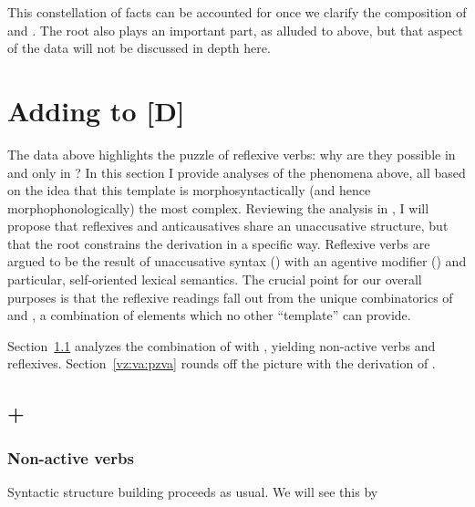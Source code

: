 \begin{exe}
\begin{xlist}
\begin{xlist}
\begin{exe}
\begin{xlist}
\begin{xlist}
\begin{exe}
\begin{xlist}
\begin{xlist}
\begin{exe}
\begin{exe}
\begin{xlist}
\begin{exe}
\begin{exe}
\begin{xlist}
\begin{exe}
\begin{exe}
\begin{exe}
\begin{exe}
\begin{exe}
\begin{xlist}
\begin{exe}
\begin{xlist}
\begin{exe}
\begin{exe}
\begin{xlist}
\begin{exe}
\begin{xlist}
\begin{exe}
\begin{xlist}
\begin{exe}
\begin{exe}
\begin{exe}
\begin{xlist}
\begin{exe}
\begin{exe}
\begin{exe}
\begin{xlist}
\begin{exe}
\begin{xlist}
\begin{exe}
\begin{exe}
\begin{xlist}
\begin{exe}
\begin{exe}
\begin{exe}
\begin{exe}
\begin{xlist}
\begin{exe}
\begin{xlist}
\begin{exe}
\begin{xlist}
\begin{exe}
\begin{xlist}
\begin{exe}
\begin{xlist}
\begin{exe}
\begin{xlist}
\begin{exe}
\begin{exe}
\begin{xlist}
\begin{exe}
\begin{xlist}
\begin{exe}
\begin{exe}
\begin{xlist}
\begin{exe}
\begin{xlist}
\begin{exe}
\begin{exe}
\begin{exe}
\begin{exe}
\begin{xlist}
\begin{xlist}
\begin{exe}
\begin{xlist}
\begin{exe}
\begin{exe}
\begin{exe}
\begin{xlist}
\begin{exe}
\begin{exe}
\begin{xlist}
\begin{exe}
\begin{exe}
\begin{exe}
\begin{xlist}
\begin{xlist}
\begin{exe}
\begin{xlist}
\begin{exe}
\begin{exe}
\begin{exe}
\begin{exe}
\begin{xlist}
This constellation of facts can be accounted for once we clarify the composition of {\va} and {\vz}. The root also plays an important part, as alluded to above, but that aspect of the data will not be discussed in depth here.


\section{Adding {\va} to [\textminus{}D]} \label{vz:va}
The data above highlights the puzzle of reflexive verbs: why are they possible in {\thit} and only in {\thit}? In this section I provide analyses of the phenomena above, all based on the idea that this template is morphosyntactically (and hence morphophonologically) the most complex. Reviewing the analysis in \cite{kastner17gjgl}, I will propose that reflexives and anticausatives share an unaccusative structure, but that the root constrains the derivation in a specific way. Reflexive verbs are argued to be the result of unaccusative syntax (\vz) with an agentive modifier (\va) and particular, self-oriented lexical semantics. The crucial point for our overall purposes is that the reflexive readings fall out from the unique combinatorics of {\vz} and {\va}, a combination of elements which no other ``template'' can provide.

Section~\ref{vz:va:vzva} analyzes the combination of {\va} with {\vz}, yielding non-active verbs and reflexives. Section~\ref{vz:va:pzva} rounds off the picture with the derivation of .

	\subsection{{\va} + {\vz}} \label{vz:va:vzva}
		\subsubsection{Non-active verbs} \label{vz:va:vzva:nact}
Syntactic structure building proceeds as usual. We will see this by 
\end{xlist}
\end{exe}
\end{exe}
\end{exe}
\end{exe}
\end{xlist}
\end{exe}
\end{xlist}
\end{xlist}
\end{exe}
\end{exe}
\end{exe}
\end{xlist}
\end{exe}
\end{exe}
\end{xlist}
\end{exe}
\end{exe}
\end{exe}
\end{xlist}
\end{exe}
\end{xlist}
\end{xlist}
\end{exe}
\end{exe}
\end{exe}
\end{exe}
\end{xlist}
\end{exe}
\end{xlist}
\end{exe}
\end{exe}
\end{xlist}
\end{exe}
\end{xlist}
\end{exe}
\end{exe}
\end{xlist}
\end{exe}
\end{xlist}
\end{exe}
\end{xlist}
\end{exe}
\end{xlist}
\end{exe}
\end{xlist}
\end{exe}
\end{xlist}
\end{exe}
\end{exe}
\end{exe}
\end{exe}
\end{xlist}
\end{exe}
\end{exe}
\end{xlist}
\end{exe}
\end{xlist}
\end{exe}
\end{exe}
\end{exe}
\end{xlist}
\end{exe}
\end{exe}
\end{exe}
\end{xlist}
\end{exe}
\end{xlist}
\end{exe}
\end{xlist}
\end{exe}
\end{exe}
\end{xlist}
\end{exe}
\end{xlist}
\end{exe}
\end{exe}
\end{exe}
\end{exe}
\end{exe}
\end{xlist}
\end{exe}
\end{exe}
\end{xlist}
\end{exe}
\end{exe}
\end{xlist}
\end{xlist}
\end{exe}
\end{xlist}
\end{xlist}
\end{exe}
\end{xlist}
\end{xlist}
\end{exe}
